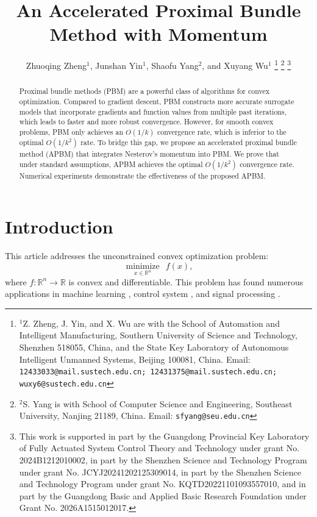 \documentclass[letterpaper, 10 pt, conference]{ieeeconf}  %
\title{\LARGE \bf
An Accelerated Proximal Bundle Method with Momentum}
\author{Zhuoqing Zheng$^1$, Junshan Yin$^1$, Shaofu Yang$^2$, and Xuyang Wu$^1$ %
\thanks{$^1$Z. Zheng, J. Yin, and X. Wu are with the School of Automation and Intelligent Manufacturing, Southern University of Science and Technology, Shenzhen 518055, China, and the State Key Laboratory of Autonomous Intelligent Unmanned Systems, Beijing 100081, China.  Email: {\tt\footnotesize 12433033@mail.sustech.edu.cn; 12431375@mail.sustech.edu.cn; wuxy6@sustech.edu.cn}}
\thanks{$^2$S. Yang is with School of Computer Science and Engineering, Southeast University, Nanjing 21189, China. Email: {\tt\footnotesize  sfyang@seu.edu.cn}}
\thanks{This work is supported in part by the Guangdong Provincial Key Laboratory of Fully Actuated System Control Theory and Technology under grant No. 2024B1212010002, in part by the Shenzhen Science and Technology Program under grant No. JCYJ20241202125309014, in part by the Shenzhen Science and Technology Program under grant No. KQTD20221101093557010, and in part by the Guangdong Basic and Applied Basic Research Foundation under Grant No. 2026A1515012017.}%
}
\begin{document}
\maketitle
\thispagestyle{empty}
\pagestyle{empty}


\begin{abstract}
    Proximal bundle methods (PBM) are a powerful class of algorithms for convex optimization. Compared to gradient descent, PBM constructs more accurate surrogate models that incorporate gradients and function values from multiple past iterations, which leads to faster and more robust convergence. However, for smooth convex problems, PBM only achieves an $O(1/k)$ convergence rate, which is inferior to the optimal $O(1/k^2)$ rate. To bridge this gap, we propose an accelerated proximal bundle method (APBM) that integrates Nesterov's momentum into PBM. We prove that under standard assumptions, APBM achieves the optimal $O(1/k^2)$ convergence rate. Numerical experiments demonstrate the effectiveness of the proposed APBM.
\end{abstract}


\section{Introduction}
This article addresses the unconstrained convex optimization problem:
\begin{equation}\label{problem}
       \underset{x \in \mathbb{R}^n}{\operatorname{minimize}} ~~ f(x),
\end{equation}
where $f : \mathbb{R}^n \rightarrow \mathbb{R}$ is convex and differentiable. This 
problem has found numerous applications in machine learning \cite{wright2022optimization}, control system \cite{agrawal2020learning}, and signal processing \cite{luo2006introduction}.
\end{document}
